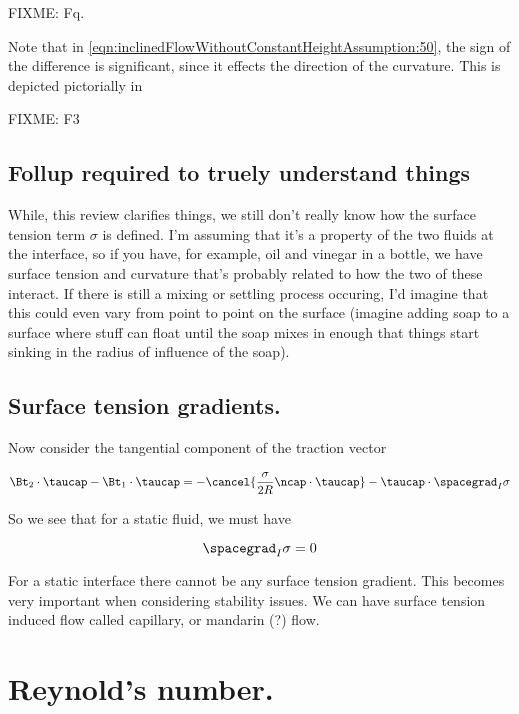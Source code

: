 FIXME: Fq.

Note that in \ref{eqn:inclinedFlowWithoutConstantHeightAssumption:50}, the sign of the difference is significant, since it effects the direction of the curvature.  This is depicted pictorially in 

FIXME: F3

\subsection{Follup required to truely understand things}

While, this review clarifies things, we still don't really know how the surface tension term $\sigma$ is defined.  I'm assuming that it's a property of the two fluids at the interface, so if you have, for example, oil and vinegar in a bottle, we have surface tension and curvature that's probably related to how the two of these interact.  If there is still a mixing or settling process occuring, I'd imagine that this could even vary from point to point on the surface (imagine adding soap to a surface where stuff can float until the soap mixes in enough that things start sinking in the radius of influence of the soap).

\subsection{Surface tension gradients.}

Now consider the tangential component of the traction vector

\begin{equation}\label{eqn:inclinedFlowWithoutConstantHeightAssumption:90}
\Bt_2 \cdot \taucap - \Bt_1 \cdot \taucap = - \cancel{ \frac{\sigma}{2 R} \ncap \cdot \taucap} - \taucap \cdot \spacegrad_I \sigma
\end{equation}

So we see that for a static fluid, we must have

\begin{equation}\label{eqn:inclinedFlowWithoutConstantHeightAssumption:110}
\spacegrad_I \sigma = 0
\end{equation}

For a static interface there cannot be any surface tension gradient.  This becomes very important when considering stability issues.  We can have surface tension induced flow called capillary, or mandarin (?) flow.

\section{Reynold's number.}

